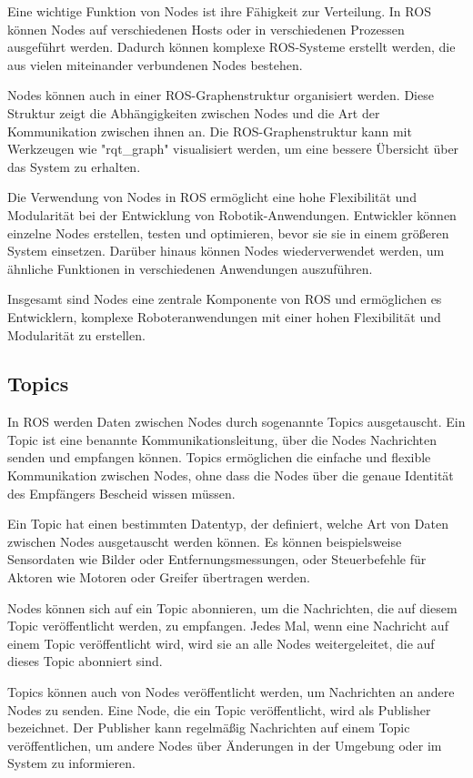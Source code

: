     Eine wichtige Funktion von Nodes ist ihre Fähigkeit zur Verteilung. In \ac{ROS} können Nodes auf verschiedenen Hosts oder in verschiedenen Prozessen ausgeführt werden. Dadurch können komplexe \ac{ROS}-Systeme erstellt werden, die aus vielen miteinander verbundenen Nodes bestehen.

    Nodes können auch in einer \ac{ROS}-Graphenstruktur organisiert werden. Diese Struktur zeigt die Abhängigkeiten zwischen Nodes und die Art der Kommunikation zwischen ihnen an. Die \ac{ROS}-Graphenstruktur kann mit Werkzeugen wie "rqt\_graph" visualisiert werden, um eine bessere Übersicht über das System zu erhalten.

    Die Verwendung von Nodes in \ac{ROS} ermöglicht eine hohe Flexibilität und Modularität bei der Entwicklung von Robotik-Anwendungen. Entwickler können einzelne Nodes erstellen, testen und optimieren, bevor sie sie in einem größeren System einsetzen. Darüber hinaus können Nodes wiederverwendet werden, um ähnliche Funktionen in verschiedenen Anwendungen auszuführen.

    Insgesamt sind Nodes eine zentrale Komponente von \ac{ROS} und ermöglichen es Entwicklern, komplexe Roboteranwendungen mit einer hohen Flexibilität und Modularität zu erstellen.

    \subsection{Topics} \label{topics:subsection}
    In \ac{ROS} werden Daten zwischen Nodes durch sogenannte Topics ausgetauscht. Ein Topic ist eine benannte Kommunikationsleitung, über die Nodes Nachrichten senden und empfangen können. Topics ermöglichen die einfache und flexible Kommunikation zwischen Nodes, ohne dass die Nodes über die genaue Identität des Empfängers Bescheid wissen müssen.

    Ein Topic hat einen bestimmten Datentyp, der definiert, welche Art von Daten zwischen Nodes ausgetauscht werden können. Es können beispielsweise Sensordaten wie Bilder oder Entfernungsmessungen, oder Steuerbefehle für Aktoren wie Motoren oder Greifer übertragen werden.

    Nodes können sich auf ein Topic abonnieren, um die Nachrichten, die auf diesem Topic veröffentlicht werden, zu empfangen. Jedes Mal, wenn eine Nachricht auf einem Topic veröffentlicht wird, wird sie an alle Nodes weitergeleitet, die auf dieses Topic abonniert sind.

    Topics können auch von Nodes veröffentlicht werden, um Nachrichten an andere Nodes zu senden. Eine Node, die ein Topic veröffentlicht, wird als Publisher bezeichnet. Der Publisher kann regelmäßig Nachrichten auf einem Topic veröffentlichen, um andere Nodes über Änderungen in der Umgebung oder im System zu informieren.

